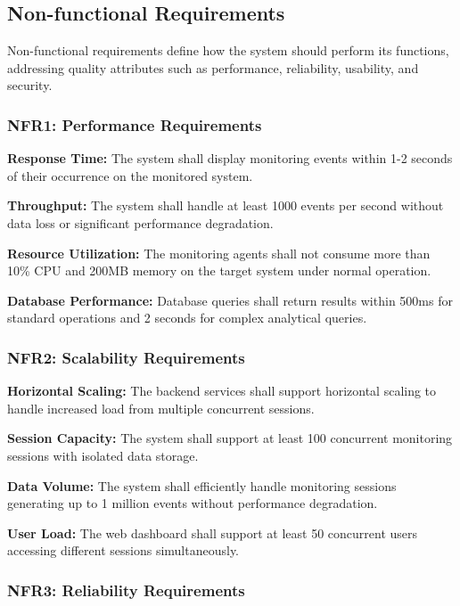 \subsection{Non-functional Requirements}

Non-functional requirements define how the system should perform its functions, addressing quality attributes such as performance, reliability, usability, and security.

\subsubsection{NFR1: Performance Requirements}

\textbf{Response Time:} The system shall display monitoring events within 1-2 seconds of their occurrence on the monitored system.

\textbf{Throughput:} The system shall handle at least 1000 events per second without data loss or significant performance degradation.

\textbf{Resource Utilization:} The monitoring agents shall not consume more than 10\% CPU and 200MB memory on the target system under normal operation.

\textbf{Database Performance:} Database queries shall return results within 500ms for standard operations and 2 seconds for complex analytical queries.

\subsubsection{NFR2: Scalability Requirements}

\textbf{Horizontal Scaling:} The backend services shall support horizontal scaling to handle increased load from multiple concurrent sessions.

\textbf{Session Capacity:} The system shall support at least 100 concurrent monitoring sessions with isolated data storage.

\textbf{Data Volume:} The system shall efficiently handle monitoring sessions generating up to 1 million events without performance degradation.

\textbf{User Load:} The web dashboard shall support at least 50 concurrent users accessing different sessions simultaneously.

\subsubsection{NFR3: Reliability Requirements}

